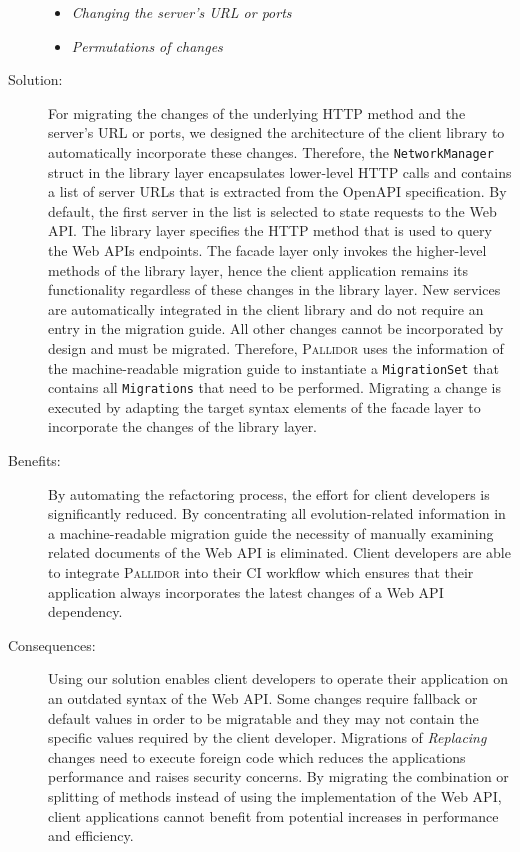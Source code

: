 \begin{description}
\begin{itemize}
		\item \textit{Changing the server's URL or ports}
		\item \textit{Permutations of changes}
	\end{itemize}
\item[Solution:] For migrating the changes of the underlying HTTP method and the server's URL or ports, we designed the architecture of the client library to automatically incorporate these changes. Therefore, the \texttt{NetworkManager} struct in the library layer encapsulates lower-level HTTP calls and contains a list of server URLs that is extracted from the OpenAPI specification. By default, the first server in the list is selected to state requests to the Web API. The library layer specifies the HTTP method that is used to query the Web APIs endpoints. The facade layer only invokes the higher-level methods of the library layer, hence the client application remains its functionality regardless of these changes in the library layer. New services are automatically integrated in the client library and do not require an entry in the migration guide.   All other changes cannot be incorporated by design and must be migrated. Therefore, \textsc{Pallidor} uses the information of the machine-readable migration guide to instantiate a \texttt{MigrationSet} that contains all \texttt{Migrations} that need to be performed. Migrating a change is executed by adapting the target syntax elements of the facade layer to incorporate the changes of the library layer.
\item[Benefits:] By automating the refactoring process, the effort for client developers is significantly reduced. By concentrating all evolution-related information in a machine-readable migration guide the necessity of manually examining related documents of the Web API is eliminated. Client developers are able to integrate \textsc{Pallidor} into their CI workflow which ensures that their application always incorporates the latest changes of a Web API dependency. 
\item[Consequences:] Using our solution enables client developers to operate their application on an outdated syntax of the Web API. Some changes require fallback or default values in order to be migratable and they may not contain the specific values required by the client developer. Migrations of \textit{Replacing} changes need to execute foreign code which reduces the applications performance and raises security concerns. By migrating the combination or splitting of methods instead of using the implementation of the Web API, client applications cannot benefit from potential increases in performance and efficiency.

\end{description}
